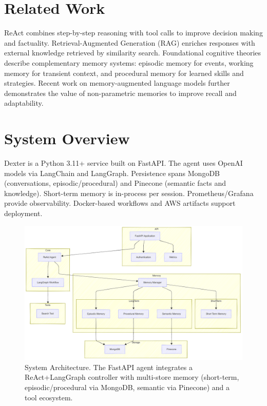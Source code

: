 \documentclass[11pt]{article}
\begin{document}
\section{Related Work}
ReAct combines step-by-step reasoning with tool calls to improve decision making and factuality\cite{yao2022react}. Retrieval-Augmented Generation (RAG) enriches responses with external knowledge retrieved by similarity search\cite{lewis2020rag}. Foundational cognitive theories describe complementary memory systems: episodic memory for events\cite{tulving1972episodic}, working memory for transient context\cite{baddeley1992working}, and procedural memory for learned skills and strategies\cite{anderson1982skill}. Recent work on memory-augmented language models further demonstrates the value of non-parametric memories to improve recall and adaptability\cite{borgeaud2022retro}.

\section{System Overview}
Dexter is a Python 3.11+ service built on FastAPI. The agent uses OpenAI models via LangChain and LangGraph. Persistence spans MongoDB (conversations, episodic/procedural) and Pinecone (semantic facts and knowledge). Short-term memory is in-process per session. Prometheus/Grafana provide observability. Docker-based workflows and AWS artifacts support deployment.

\begin{figure}[h]
  \centering
  \includegraphics[width=0.95\linewidth]{../../docs/System_Architecture.png}
  \caption{System Architecture. The FastAPI agent integrates a ReAct+LangGraph controller with multi-store memory (short-term, episodic/procedural via MongoDB, semantic via Pinecone) and a tool ecosystem.}
  \label{fig:system}
\end{figure}
\end{document}
